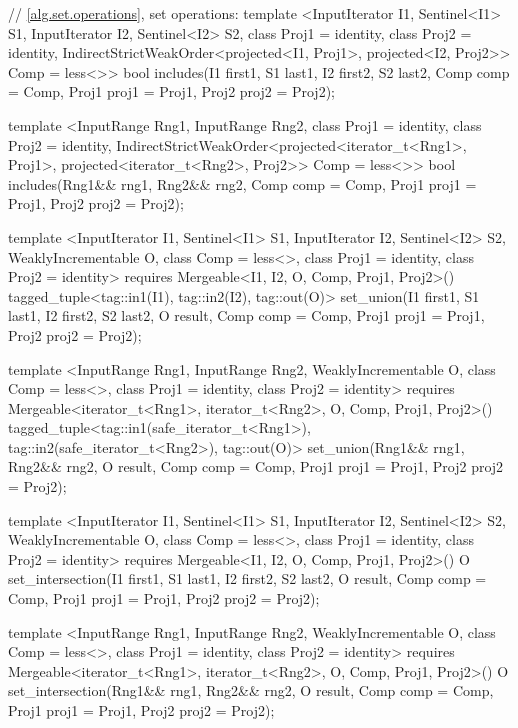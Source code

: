 \begin{codeblock}
{{{{  // \ref{alg.set.operations}, set operations:
  template <InputIterator I1, Sentinel<I1> S1, InputIterator I2, Sentinel<I2> S2,
      class Proj1 = identity, class Proj2 = identity,
      IndirectStrictWeakOrder<projected<I1, Proj1>, projected<I2, Proj2>> Comp = less<>>
    bool
      includes(I1 first1, S1 last1, I2 first2, S2 last2, Comp comp = Comp{},
               Proj1 proj1 = Proj1{}, Proj2 proj2 = Proj2{});

  template <InputRange Rng1, InputRange Rng2, class Proj1 = identity,
      class Proj2 = identity,
      IndirectStrictWeakOrder<projected<iterator_t<Rng1>, Proj1>,
        projected<iterator_t<Rng2>, Proj2>> Comp = less<>>
    bool
      includes(Rng1&& rng1, Rng2&& rng2, Comp comp = Comp{},
               Proj1 proj1 = Proj1{}, Proj2 proj2 = Proj2{});

  template <InputIterator I1, Sentinel<I1> S1, InputIterator I2, Sentinel<I2> S2,
      WeaklyIncrementable O, class Comp = less<>, class Proj1 = identity, class Proj2 = identity>
    requires Mergeable<I1, I2, O, Comp, Proj1, Proj2>()
    tagged_tuple<tag::in1(I1), tag::in2(I2), tag::out(O)>
      set_union(I1 first1, S1 last1, I2 first2, S2 last2, O result, Comp comp = Comp{},
                Proj1 proj1 = Proj1{}, Proj2 proj2 = Proj2{});

  template <InputRange Rng1, InputRange Rng2, WeaklyIncrementable O,
      class Comp = less<>, class Proj1 = identity, class Proj2 = identity>
    requires Mergeable<iterator_t<Rng1>, iterator_t<Rng2>, O, Comp, Proj1, Proj2>()
    tagged_tuple<tag::in1(safe_iterator_t<Rng1>),
                 tag::in2(safe_iterator_t<Rng2>),
                 tag::out(O)>
      set_union(Rng1&& rng1, Rng2&& rng2, O result, Comp comp = Comp{},
                Proj1 proj1 = Proj1{}, Proj2 proj2 = Proj2{});

  template <InputIterator I1, Sentinel<I1> S1, InputIterator I2, Sentinel<I2> S2,
      WeaklyIncrementable O, class Comp = less<>, class Proj1 = identity, class Proj2 = identity>
    requires Mergeable<I1, I2, O, Comp, Proj1, Proj2>()
    O
      set_intersection(I1 first1, S1 last1, I2 first2, S2 last2, O result,
                       Comp comp = Comp{}, Proj1 proj1 = Proj1{}, Proj2 proj2 = Proj2{});

  template <InputRange Rng1, InputRange Rng2, WeaklyIncrementable O,
      class Comp = less<>, class Proj1 = identity, class Proj2 = identity>
    requires Mergeable<iterator_t<Rng1>, iterator_t<Rng2>, O, Comp, Proj1, Proj2>()
    O
      set_intersection(Rng1&& rng1, Rng2&& rng2, O result,
                       Comp comp = Comp{}, Proj1 proj1 = Proj1{}, Proj2 proj2 = Proj2{});

}}}}
\end{codeblock}
